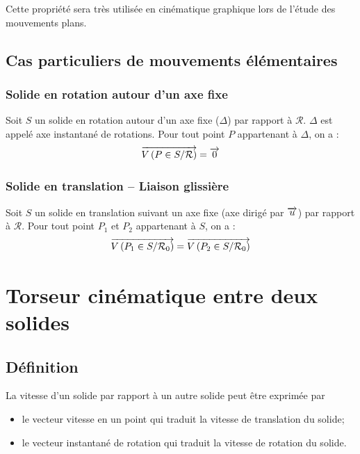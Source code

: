 \documentclass[11pt,oneside]{article}
\begin{document}
\begin{rem}
Cette propriété sera très utilisée en cinématique graphique lors de l'étude des mouvements plans.
\end{rem}

\subsection{Cas particuliers de mouvements élémentaires}
\subsubsection{Solide en rotation autour d'un axe fixe}

Soit $S$ un solide en rotation autour d'un axe fixe ($\Delta$) par rapport à $\mathcal{R}$. $\Delta$ est appelé axe instantané de rotations. Pour tout point $P$ appartenant à $\Delta$, on a : 
$$\overrightarrow{V\left( {P} \in {S}/{\mathcal{R}}\right)}=\overrightarrow{0}$$



\subsubsection{Solide en translation -- Liaison glissière}

Soit $S$ un solide en translation suivant un axe fixe (axe dirigé par $\overrightarrow{u}$) par rapport à $\mathcal{R}$. Pour tout point $P_1$ et $P_2$ appartenant à $S$, on a : 
$$
\overrightarrow{V\left( {P_1} \in {S}/{\mathcal{R}_0}\right)}=\overrightarrow{V\left( {P_2} \in {S}/{\mathcal{R}_0}\right)}
$$




\section{Torseur cinématique entre deux solides}
\subsection{Définition}
La vitesse d'un solide par rapport à un autre solide peut être exprimée par 
\begin{itemize}
\item le vecteur vitesse en un point qui traduit la vitesse de translation du solide;
\item le vecteur instantané de rotation qui traduit la vitesse de rotation du solide.
\end{itemize}
\end{document}
